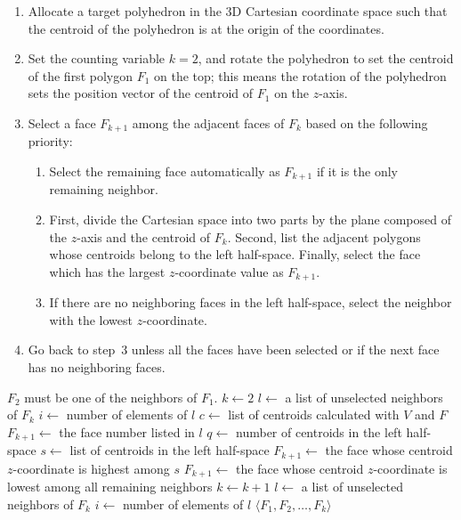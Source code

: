 \documentclass[12pt]{article}
\theoremstyle{plain}
\theoremstyle{definition}
\theoremstyle{remark}
\begin{document}
\begin{enumerate}
\item Allocate a target polyhedron in the 3D Cartesian coordinate space
  such that the centroid of the polyhedron is at the origin of the
  coordinates.
\item Set the counting variable $k=2$, and rotate the polyhedron to set
  the centroid of the first polygon $F_1$ on the top; this means the
  rotation of the polyhedron sets the position vector of the centroid of
  $F_1$ on the $z$-axis.
\item Select a face $F_{k+1}$ among the adjacent faces of $F_k$ based on
  the following priority:
  \begin{enumerate}
  \item Select the remaining face automatically as $F_{k+1}$ if it is
    the only remaining neighbor.
  \item First, divide the Cartesian space into two parts by the plane
    composed of the $z$-axis and the centroid of $F_k$.
    Second, list the adjacent polygons whose centroids belong to the left
    half-space.
    Finally, select the face which has the largest $z$-coordinate value
    as $F_{k+1}$.
  \item If there are no neighboring faces in the left half-space,
    select the neighbor with the lowest $z$-coordinate.
  \end{enumerate}
\item Go back to step~3 unless all the faces have been selected or if the
  next face has no neighboring faces.
\end{enumerate}

\begin{algorithm}[tb]
\caption{Algorithm of apple peeling a polyhedron}
\label{peeling}
\begin{algorithmic}[1]
\Require $F_2$ must be one of the neighbors of $F_1$.
  \State $k \gets 2$
  \State $l \gets$ a list of unselected neighbors of $F_{k}$
  \State $i \gets$ number of elements of $l$
  \State $c \gets$ list of centroids calculated with $V$ and $F$
  \Repeat
      \State $F_{k+1} \gets$ the face number listed in $l$
      \State $q \gets$ number of centroids in the left half-space
      \State $s \gets$ list of centroids in the left half-space
        \State $F_{k+1} \gets$ the face whose centroid $z$-coordinate
               is highest among $s$
      \Else
        \State $F_{k+1} \gets$ the face whose centroid $z$-coordinate
               is lowest among all remaining neighbors
      \EndIf
    \EndIf
    \State $k \gets k + 1$
    \State $l \gets$ a list of unselected neighbors of $F_{k}$
    \State $i \gets$ number of elements of $l$
  \State \Return $\langle F_1, F_2, \ldots, F_{k}\rangle$
\EndFunction
\end{algorithmic}
\end{algorithm}
\end{document}
